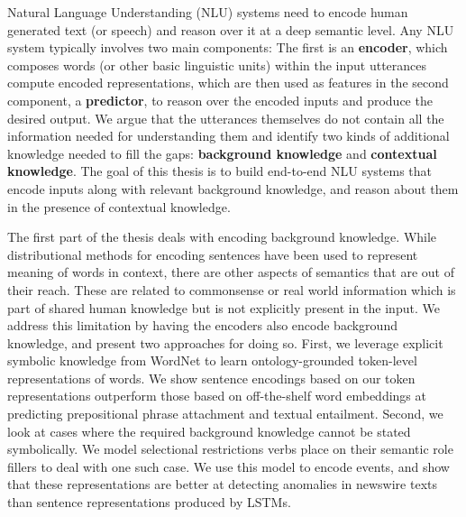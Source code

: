 Natural Language Understanding (NLU) systems need to encode human generated text (or speech) and reason over it at a deep semantic level.
Any NLU system typically involves two main components: The first is an \textbf{encoder}, which composes words (or other basic linguistic units) within the input utterances compute encoded representations, 
which are then used as features in the second component, a \textbf{predictor}, to reason over the encoded inputs and produce the desired output. We argue that the utterances themselves
do not contain all the information needed for understanding them and identify two kinds of additional knowledge needed to fill the gaps: 
\textbf{background knowledge} and \textbf{contextual knowledge}. The goal of this thesis is to build end-to-end NLU systems that encode inputs along with relevant
background knowledge, and reason about them in the presence of contextual knowledge.

The first part of the thesis deals with encoding background knowledge. While distributional methods for encoding sentences have been
used to represent meaning of words in context, there are other aspects of semantics that are out of their reach. These are related to
commonsense or real world information which is part of shared human knowledge but is not explicitly present in the input. We address this limitation
by having the encoders also encode background knowledge, and present two approaches for doing so.
First, we leverage explicit symbolic knowledge from WordNet to learn ontology-grounded token-level representations of words. 
We show sentence encodings based on our token representations outperform those based on off-the-shelf word embeddings at predicting prepositional phrase attachment and
textual entailment.
Second, we look at cases where the required background knowledge cannot be stated symbolically. We model selectional restrictions
verbs place on their semantic role fillers to deal with one such case. We use this model to encode events, and show that these representations are better at detecting anomalies
in newswire texts than sentence representations produced by LSTMs.

